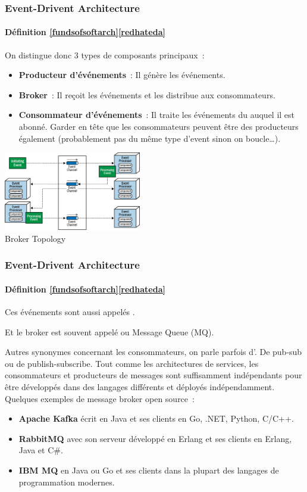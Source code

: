 \documentclass{beamer}
\begin{document}
    \begin{frame}
        \transdissolve
        \frametitle{Event-Drivent Architecture}
        \framesubtitle{Définition \cref{fundsofsoftarch}\footnotestep\cref{redhateda}}
        On distingue donc 3 types de composants principaux~:
        \begin{itemize}
            \item \textbf{Producteur d'événements}~: Il génère les événements.
            \item \textbf{Broker}~: Il reçoit les événements et les distribue aux consommateurs.
            \item \textbf{Consommateur d'événements}~: Il traite les événements du  auquel il est abonné.
            Garder en tête que les consommateurs peuvent être des producteurs également (probablement pas du même type d'event sinon on boucle\ldots).
        \end{itemize}
        \bigbreak
        \centering
        \includegraphics[width=6cm]{image/event-driven-broker-topology} \\ Broker Topology \\
    \end{frame}

    \begin{frame}
        \transdissolve
        \frametitle{Event-Drivent Architecture}
        \framesubtitle{Définition \cref{fundsofsoftarch}\footnotestep\cref{redhateda}}
        Ces événements sont aussi appelés .

        Et le broker est souvent appelé  ou Message Queue (MQ).

        Autres synonymes concernant les consommateurs, on parle parfois d'.
        De pub-sub ou de publish-subscribe.
        \bigbreak
        Tout comme les architectures de services, les consommateurs et producteurs de messages sont suffisamment indépendants pour être développés dans des langages différents et déployés indépendamment.
        \bigbreak
        Quelques exemples de message broker open source~:
        \begin{itemize}
            \item \textbf{Apache Kafka} écrit en Java et ses clients en Go, .NET, Python, C/C++.
            \item \textbf{RabbitMQ} avec son serveur développé en Erlang et ses clients en Erlang, Java et C\#.
            \item \textbf{IBM MQ} en Java ou Go et ses clients dans la plupart des langages de programmation modernes.
        \end{itemize}
    \end{frame}
\end{document}
